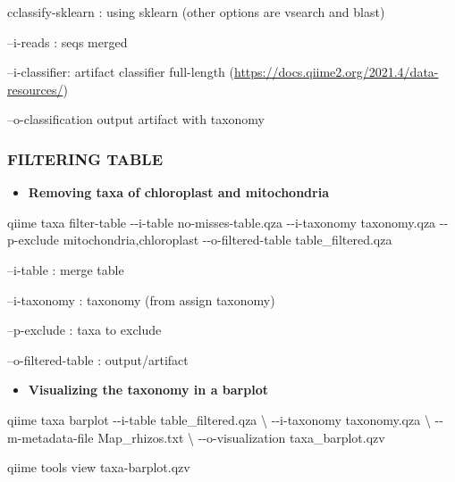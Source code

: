 \documentclass[]{interact}
\theoremstyle{plain}%
\theoremstyle{definition}
\theoremstyle{remark}
\newenvironment{Shaded}{\begin{snugshade}}{\end{snugshade}}
\newcommand{\AttributeTok}[1]{\textcolor[rgb]{0.77,0.63,0.00}{#1}}
\newcommand{\DataTypeTok}[1]{\textcolor[rgb]{0.13,0.29,0.53}{#1}}
\newcommand{\ExtensionTok}[1]{#1}
\newcommand{\NormalTok}[1]{#1}
\def\tightlist{}
\begin{document}
cclassify-sklearn : using sklearn (other options are vsearch and blast)

--i-reads : seqs merged

--i-classifier: artifact classifier full-length
(\url{https://docs.qiime2.org/2021.4/data-resources/})

--o-classification output artifact with taxonomy

\hypertarget{filtering-table}{%
\subsubsection{FILTERING TABLE}\label{filtering-table}}

\begin{itemize}
\tightlist
\item
  \textbf{Removing taxa of chloroplast and mitochondria}
\end{itemize}

\begin{Shaded}
\begin{Highlighting}[]
\ExtensionTok{qiime}\NormalTok{ taxa filter{-}table}
\ExtensionTok{{-}{-}i{-}table}\NormalTok{ no{-}misses{-}table.qza}
\ExtensionTok{{-}{-}i{-}taxonomy}\NormalTok{ taxonomy.qza}
\ExtensionTok{{-}{-}p{-}exclude}\NormalTok{ mitochondria,chloroplast }
\ExtensionTok{{-}{-}o{-}filtered{-}table}\NormalTok{ table\_filtered.qza}
\end{Highlighting}
\end{Shaded}

--i-table : merge table

--i-taxonomy : taxonomy (from assign taxonomy)

--p-exclude : taxa to exclude

--o-filtered-table : output/artifact

\begin{itemize}
\tightlist
\item
  \textbf{Visualizing the taxonomy in a barplot}
\end{itemize}

\begin{Shaded}
\begin{Highlighting}[]
\ExtensionTok{qiime}\NormalTok{ taxa barplot }\AttributeTok{{-}{-}i{-}table}\NormalTok{ table\_filtered.qza }\DataTypeTok{\textbackslash{}}
\NormalTok{{-}{-}i{-}taxonomy taxonomy.qza }\DataTypeTok{\textbackslash{}}
\NormalTok{{-}{-}m{-}metadata{-}file Map\_rhizos.txt }\DataTypeTok{\textbackslash{}}
\NormalTok{{-}{-}o{-}visualization taxa\_barplot.qzv}


\ExtensionTok{qiime}\NormalTok{ tools view taxa{-}barplot.qzv}
\end{Highlighting}
\end{Shaded}
\end{document}
